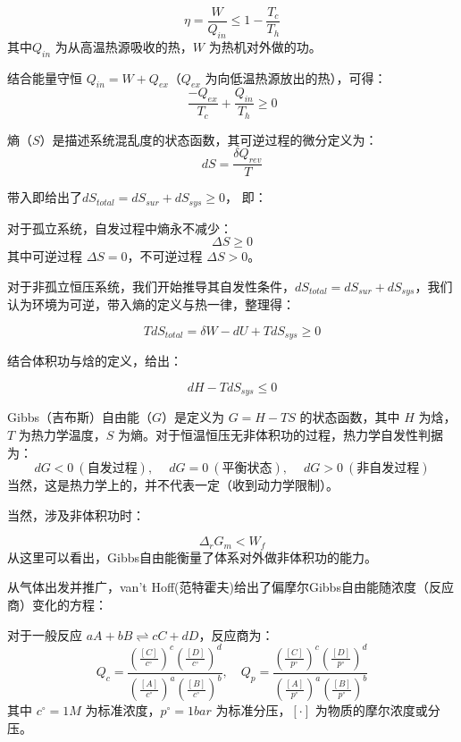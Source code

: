 \begin{proposition}[Carnot定理]
$$\eta = \frac{W}{Q_{in}} \leq 1 - \frac{T_c}{T_h}$$
其中$Q_{in}$ 为从高温热源吸收的热，$W$ 为热机对外做的功。
\end{proposition}

结合能量守恒 $Q_{in} = W + Q_{ex}$（$Q_{ex}$ 为向低温热源放出的热），可得：
$$\frac{-Q_{ex}}{T_c} + \frac{Q_{in}}{T_h} \geq 0$$


\begin{definition}[熵]
熵（$S$）是描述系统混乱度的状态函数，其可逆过程的微分定义为：
$$dS = \frac{\delta Q_{rev}}{T}$$
\end{definition}

带入即给出了$dS_{total} = dS_{sur} + dS_{sys} \geq 0$， 即：

\begin{proposition}
对于孤立系统，自发过程中熵永不减少：
$$\Delta S \geq 0$$
其中可逆过程 $\Delta S = 0$，不可逆过程 $\Delta S > 0$。
\end{proposition}

对于非孤立恒压系统，我们开始推导其自发性条件，$dS_{total} = dS_{sur} + dS_{sys}$，我们认为环境为可逆，带入熵的定义与热一律，整理得：

$$T dS_{total} = \delta W - dU + T dS_{sys} \geq 0 $$

结合体积功与焓的定义，给出：

$$dH - T dS_{sys} \leqslant 0 $$

\begin{definition}
Gibbs（吉布斯）自由能（$G$）是定义为 $G = H - TS$ 的状态函数，其中 $H$ 为焓，$T$ 为热力学温度，$S$ 为熵。对于恒温恒压无非体积功的过程，热力学自发性判据为：
$$dG < 0 \ (\text{自发过程}),\quad \ dG = 0 \ (\text{平衡状态}),\quad \ dG > 0 \ (\text{非自发过程})$$
当然，这是热力学上的，并不代表一定（收到动力学限制）。
\end{definition}

当然，涉及非体积功时：

\begin{proposition}[热力学允许条件]
$$\Delta_r G_m < W_f$$
从这里可以看出，Gibbs自由能衡量了体系对外做非体积功的能力。
\end{proposition}



从气体出发并推广，van't Hoff(范特霍夫)给出了偏摩尔Gibbs自由能随浓度（反应商）变化的方程：

\begin{definition}[浓度商]
对于一般反应 $aA + bB \rightleftharpoons cC + dD$，反应商为：
$$Q_c = \frac{\left(\frac{[C]}{c^\circ}\right)^c \left(\frac{[D]}{c^\circ}\right)^d}{\left(\frac{[A]}{c^\circ}\right)^a \left(\frac{[B]}{c^\circ}\right)^b},\quad Q_p = \frac{\left(\frac{[C]}{p^\circ}\right)^c \left(\frac{[D]}{p^\circ}\right)^d}{\left(\frac{[A]}{p^\circ}\right)^a \left(\frac{[B]}{p^\circ}\right)^b}$$
其中 $c^\circ = 1M$ 为标准浓度，$p^\circ = 1bar$ 为标准分压，$[\cdot]$ 为物质的摩尔浓度或分压。
\end{definition}


